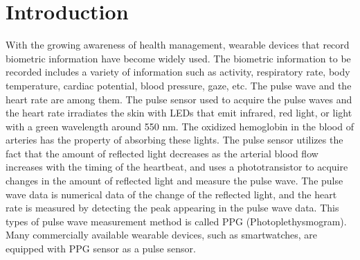 \documentclass[sigchi,authordraft]{acmart}
\begin{document}



\maketitle

\section{Introduction}
\label{sec:introduction}
With the growing awareness of health management, wearable devices that record biometric information have become widely used. The biometric information to be recorded includes a variety of information such as activity, respiratory rate, body temperature, cardiac potential, blood pressure, gaze, etc. The pulse wave and the heart rate are among them. The pulse sensor used to acquire the pulse waves and the heart rate irradiates the skin with LEDs that emit infrared, red light, or light with a green wavelength around 550 nm. The oxidized hemoglobin in the blood of arteries has the property of absorbing these lights. The pulse sensor utilizes the fact that the amount of reflected light decreases as the arterial blood flow increases with the timing of the heartbeat, and uses a phototransistor to acquire changes in the amount of reflected light and measure the pulse wave. The pulse wave data is numerical data of the change of the reflected light, and the heart rate is measured by detecting the peak appearing in the pulse wave data. This types of pulse wave measurement method is called PPG (Photoplethysmogram). Many commercially available wearable devices, such as smartwatches, are equipped with PPG sensor as a pulse sensor. 
\end{document}
